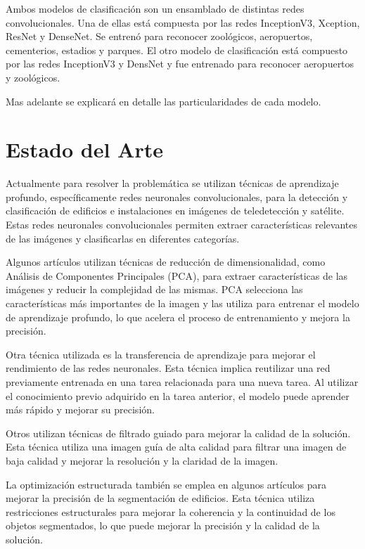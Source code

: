 \documentclass[article]{llncs}
\begin{document}
Ambos modelos de clasificaci\'on son un ensamblado de distintas redes convolucionales. Una de ellas est\'a compuesta por las redes 
InceptionV3\cite{inceptionv3}, Xception\cite{xception}, ResNet\cite{resnet} y DenseNet\cite{densenet}. Se entren\'o para reconocer zool\'ogicos, aeropuertos, cementerios, estadios y parques. 
El otro modelo de clasificación est\'a compuesto por las redes InceptionV3 y DensNet y fue entrenado para reconocer aeropuertos y zool\'ogicos.

Mas adelante se explicar\'a en detalle las particularidades de cada modelo.

  

\section{Estado del Arte}
Actualmente para resolver la problemática se utilizan técnicas de aprendizaje profundo, específicamente 
redes neuronales convolucionales, para la detección y clasificación de edificios e instalaciones en imágenes de 
teledetección y satélite. Estas redes neuronales convolucionales permiten extraer características relevantes de las imágenes 
y clasificarlas en diferentes categorías.

Algunos artículos utilizan técnicas de reducción de dimensionalidad, como Análisis de Componentes Principales 
(PCA), para extraer características de las imágenes y reducir la complejidad de las mismas. PCA selecciona las 
características más importantes de la imagen y las utiliza para entrenar el modelo de aprendizaje profundo, lo que 
acelera el proceso de entrenamiento y mejora la precisión.

Otra técnica utilizada es la transferencia de aprendizaje para mejorar el rendimiento de las redes neuronales. Esta 
técnica implica reutilizar una red previamente entrenada en una tarea relacionada para una nueva tarea. 
Al utilizar el conocimiento previo adquirido en la tarea anterior, el modelo puede aprender más rápido y mejorar 
su precisión.

Otros utilizan técnicas de filtrado guiado para mejorar la calidad de la solución. Esta técnica utiliza una 
imagen guía de alta calidad para filtrar una imagen de baja calidad y mejorar la resolución y la claridad de la imagen.

La optimización estructurada también se emplea en algunos artículos para mejorar la precisión de la segmentación de 
edificios. Esta técnica utiliza restricciones estructurales para mejorar la coherencia y la continuidad de los 
objetos segmentados, lo que puede mejorar la precisión y la calidad de la solución.
\end{document}
